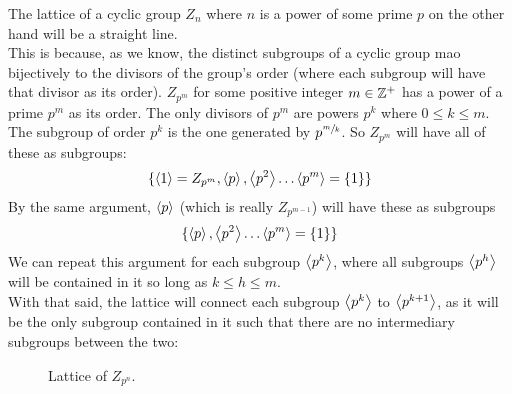 \documentclass[12pt]{article}
\begin{document}
    The lattice of a cyclic group $Z_n$
    where $n$ is a power of some prime $p$
    on the other hand will be a straight line. \\
    This is because,
    as we know,
    the distinct subgroups of a cyclic group
    mao bijectively to the divisors of the group's order
    (where each subgroup will have that divisor as its order). 
    $Z_{p^m}$ for some positive integer $m \in \mathbb{Z}^+$
    has a power of a prime $p^m$ as its order.
    The only divisors of $p^m$
    are powers $p^k$ where $0 \leqslant k \leqslant m$.
    The subgroup of order $p^k$
    is the one generated by $p^{\sfrac{m}{k}}$.
    So $Z_{p^m}$ will have all of these as subgroups:
    \[ \{ \left\langle 1 \right\rangle = Z_{p^m}, \left\langle p \right\rangle, \left\langle p^2 \right\rangle
    \dots \left\langle p^m \right\rangle = \{1\} \} \]
    By the same argument,
    $\left\langle p \right\rangle$ (which is really $Z_{p^{m-1}}$)
    will have these as subgroups
    \[ \{ \left\langle p \right\rangle, \left\langle p^2 \right\rangle
    \dots \left\langle p^m \right\rangle = \{1\} \} \]
    We can repeat this argument for each subgroup $\left\langle p^k \right\rangle$,
    where all subgroups $\left\langle p^h \right\rangle$ 
    will be contained in it so long as $k \leqslant h \leqslant m$. \\
    With that said,
    the lattice will connect
    each subgroup $\left\langle p^k \right\rangle$ to $\left\langle p^{k+1} \right\rangle$,
    as it will be the only subgroup contained in it
    such that there are no intermediary subgroups between the two:
    \begin{figure}[H]
        \centering
    \caption{\label{fig:figure1} Lattice of $Z_{p^n}$.}
    \end{figure} 
\end{document}
